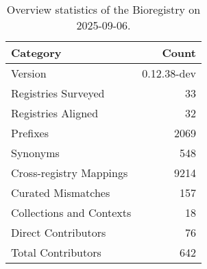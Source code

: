 \begin{table}
\caption{Overview statistics of the Bioregistry on 2025-09-06.}
\label{tab:bioregistry-summary}
\begin{tabular}{lr}
\toprule
Category & Count \\
\midrule
Version & 0.12.38-dev \\
Registries Surveyed & 33 \\
Registries Aligned & 32 \\
Prefixes & 2069 \\
Synonyms & 548 \\
Cross-registry Mappings & 9214 \\
Curated Mismatches & 157 \\
Collections and Contexts & 18 \\
Direct Contributors & 76 \\
Total Contributors & 642 \\
\bottomrule
\end{tabular}
\end{table}
